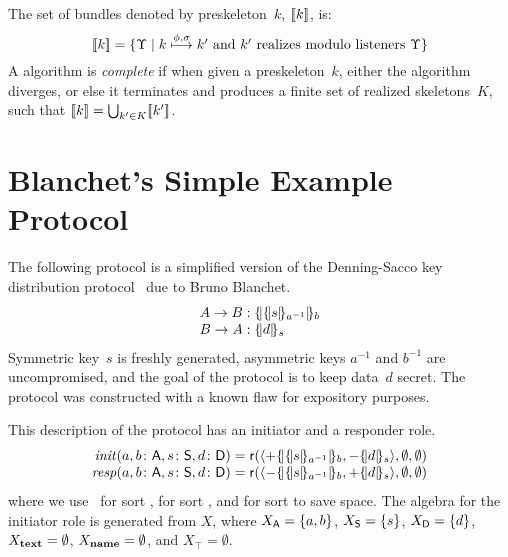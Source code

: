 \documentclass[12pt]{report}
\theoremstyle{definition}
\newcommand{\role}{\mathsf{r}}
\newcommand{\init}{\fn{init}}
\newcommand{\resp}{\fn{resp}}
\begin{document}
The set of bundles denoted by preskeleton~$k$, $[\![k]\!]$, is:
$$[\![k]\!] = \{\Upsilon\mid
\mbox{$k\stackrel{\phi,\sigma}{\longmapsto}k'$ and $k'$ realizes modulo
  listeners $\Upsilon$}\}$$ A {\cpsa} algorithm is \emph{complete} if
when given a preskeleton~$k$, either the algorithm diverges, or else it
terminates and produces a finite set of realized skeletons~$K$, such
that $[\![k]\!]=\bigcup_{k'\in K}[\![k']\!]$.
\label{def:preskeleton denotation}

\section{Blanchet's Simple Example Protocol}\label{sec:blanchet's
  simple example protocol}

The following protocol is a simplified version of the Denning-Sacco
key distribution protocol~\cite{DenningSacco81} due to Bruno Blanchet.
$$\begin{array}{r@{{}:{}}l}
A\to B&\enc{\enc{s}{a^{-1}}}{b}\\
B\to A&\enc{d}{s}
\end{array}$$
Symmetric key~$s$ is freshly generated, asymmetric keys $a^{-1}$ and
$b^{-1}$ are uncompromised, and the goal of the protocol is to keep
data~$d$ secret.  The protocol was constructed with a known flaw for
expository purposes.

This {\cpsa} description of the protocol has an initiator and a
responder role.
$$\begin{array}{r@{{}={}}l}
\init(a,b\colon\srt{A},s\colon\srt{S}, d\colon\srt{D})&
\role(\seq{\outbnd\enc{\enc{s}{a^{-1}}}{b},\inbnd\enc{d}{s}},
\emptyset,\emptyset)\\
\resp(a,b\colon\srt{A},s\colon\srt{S}, d\colon\srt{D})&
\role(\seq{\inbnd\enc{\enc{s}{a^{-1}}}{b},\outbnd\enc{d}{s}},
\emptyset,\emptyset)
\end{array}$$
where we use~ for sort ,  for sort , and
 for sort  to save space.  The algebra for the initiator
role is generated from $X$, where $X_{\mathsf{A}}=\{a,b\}$, $X_{\mathsf{S}}=\{s\}$,
$X_{\mathsf{D}}=\{d\}$, $X_{\operatorname{\mathbf{text}}}=\emptyset$, $X_{\operatorname{\mathbf{name}}}=\emptyset$,
and $X_\top=\emptyset$.
\end{document}
